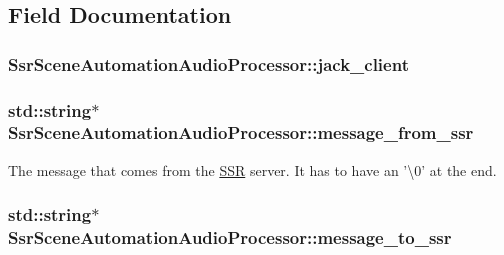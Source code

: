 \subsection{Field Documentation}
\hypertarget{classSsrSceneAutomationAudioProcessor_a77e39471c75bf35dc14b7cee9fb55130}{
\subsubsection[{jack\-\_\-client}]{ Ssr\-Scene\-Automation\-Audio\-Processor\-::jack\-\_\-client\hspace{0.3cm}{\ttfamily [private]}}}\label{classSsrSceneAutomationAudioProcessor_a77e39471c75bf35dc14b7cee9fb55130}
\hypertarget{classSsrSceneAutomationAudioProcessor_a65e29a4ddbaeb3659895ac0191299fa5}{
\subsubsection[{message\-\_\-from\-\_\-ssr}]{\setlength{\rightskip}{0pt plus 5cm}std\-::string$\ast$ Ssr\-Scene\-Automation\-Audio\-Processor\-::message\-\_\-from\-\_\-ssr\hspace{0.3cm}{\ttfamily [private]}}}\label{classSsrSceneAutomationAudioProcessor_a65e29a4ddbaeb3659895ac0191299fa5}
The message that comes from the \hyperlink{namespaceSSR}{S\-S\-R} server. It has to have an '\textbackslash{}0' at the end. \hypertarget{classSsrSceneAutomationAudioProcessor_a1b5359f318acfbe073ba294a974d2620}{
\subsubsection[{message\-\_\-to\-\_\-ssr}]{\setlength{\rightskip}{0pt plus 5cm}std\-::string$\ast$ Ssr\-Scene\-Automation\-Audio\-Processor\-::message\-\_\-to\-\_\-ssr\hspace{0.3cm}{\ttfamily [private]}}}\label{classSsrSceneAutomationAudioProcessor_a1b5359f318acfbe073ba294a974d2620}
